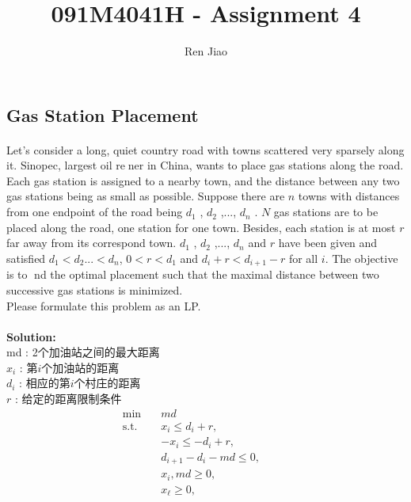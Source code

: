 \documentclass[11pt]{article}
\title{091M4041H - Assignment 4}
\author{Ren Jiao}
\begin{document}
\begin{CJK*}{GBK}{song}
    \maketitle

    \section{Gas Station Placement}

    \paragraph{} Let's consider a long, quiet country road with towns scattered very sparsely along it. Sinopec, largest oil rener in China, wants to place gas stations along the road. Each gas station is assigned to a nearby town, and the distance between any two gas stations being as small as possible. Suppose there are $n$ towns with distances from one endpoint of the road being $d_1$ , $d_2$ ,..., $d_n$ . $N$ gas stations are to be placed along the road, one station for one town. Besides, each station is at most $r$ far away from its correspond town. $d_1$ , $d_2$ ,..., $d_n$ and $r$ have been given and satisfied $d_1 < d_2 ... < d_n$, $0 < r < d_1$ and $d_i + r < d_{i+1}-r$ for all $i$. The objective is to nd the optimal placement such that the maximal distance between two successive gas stations is minimized.\\
    Please formulate this problem as an LP.

    \paragraph{}\textbf{Solution:}  \\
    md :    2个加油站之间的最大距离 \\
    $x_i$ : 第$i$个加油站的距离     \\
    $d_i$ : 相应的第$i$个村庄的距离 \\
    $r$   : 给定的距离限制条件      \\

\begin{alignat*}{2}
\min\quad & md &{}& \tag{LP1} \label{eqn - lp}\\
\mbox{s.t.}\quad
 & x_{i}  \leq d_i + r, &\quad& \\ %
 & -x_{i} \leq -d_i + r, &\quad& \\
 & d_{i+1}-d_i - md \leq 0, &\quad& \\
 & x_{i}, md \geq 0, &\quad& \\
 & x_{\ell} \geq 0, &{}&           %
\end{alignat*}


\end{CJK*}
\end{document}
